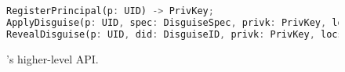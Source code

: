 \begin{figure}[t]
\begin{lstlisting}[language=Rust, style=rust]
RegisterPrincipal(p: UID) -> PrivKey;
ApplyDisguise(p: UID, spec: DisguiseSpec, privk: PrivKey, locs: Vec<Locator>) -> (DisguiseID, Vec<Locator>);
RevealDisguise(p: UID, did: DisguiseID, privk: PrivKey, locs: Locator);
\end{lstlisting}
\caption{\sys's higher-level API.}
\label{f:api-high}
\end{figure}

